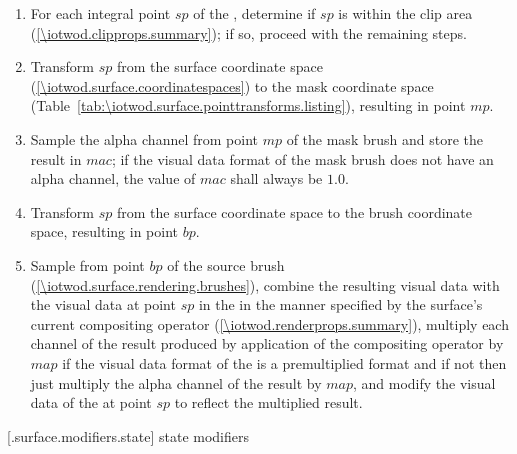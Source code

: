 \begin{enumerate}
\item For each integral point $sp$ of the \underlyingsurface, determine if $sp$ is within the clip area (\ref{\iotwod.clipprops.summary}); if so, proceed with the remaining steps.
\item Transform $sp$ from the surface coordinate space (\ref{\iotwod.surface.coordinatespaces}) to the mask coordinate space (Table~\ref{tab:\iotwod.surface.pointtransforms.listing}), resulting in point $mp$.
\item Sample the alpha channel from point $mp$ of the mask brush and store the result in $mac$; if the visual data format of the mask brush does not have an alpha channel, the value of $mac$ shall always be $1.0$.
\item Transform $sp$ from the surface coordinate space to the brush coordinate space, resulting in point $bp$.
\item Sample from point $bp$ of the source brush (\ref{\iotwod.surface.rendering.brushes}), combine the resulting visual data with the visual data at point $sp$ in the \underlyingsurface in the manner specified by the surface's current compositing operator (\ref{\iotwod.renderprops.summary}), multiply each channel of the result produced by application of the compositing operator by $map$ if the visual data format of the \underlyingsurface is a premultiplied format and if not then just multiply the alpha channel of the result by $map$, and modify the visual data of the \underlyingsurface at point $sp$ to reflect the multiplied result.
\end{enumerate}

 [\iotwod.surface.modifiers.state] { state modifiers}


